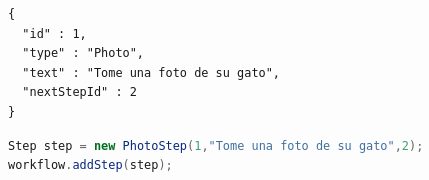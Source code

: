 \begin{lstlisting}[language=XML, frame=tlbr, caption=PhotoStep usando el generador de clases.]	
{
  "id" : 1,
  "type" : "Photo",
  "text" : "Tome una foto de su gato",
  "nextStepId" : 2
}
\end{lstlisting}

\begin{lstlisting}[language=Java, frame=tlbr, caption=PhotoStep en Java.]	
Step step = new PhotoStep(1,"Tome una foto de su gato",2);
workflow.addStep(step);
\end{lstlisting}


